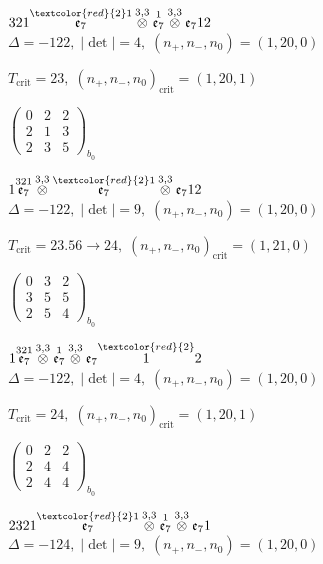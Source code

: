 \documentclass[10pt]{article}
\begin{document}
$321\overset{\textcolor{red}{2}1}{\mathfrak{e}_7}\overset{3,3}{\otimes}\overset{1}{\mathfrak{e}_7}\overset{3,3}{\otimes}\mathfrak{e}_712$ \quad $\Delta=-122,\; |\det|=4,\; (n_+,n_-,n_0)=(1,20,0)$

\hspace{1em}$T_{\text{crit}}=23,\; (n_+,n_-,n_0)_{\text{crit}}=(1,20,1)$

\hspace{2em}$\left(\begin{smallmatrix}0 & 2 & 2 \\ 2 & 1 & 3 \\ 2 & 3 & 5\end{smallmatrix}\right)_{\!b_0}$

$1\overset{321}{\mathfrak{e}_7}\overset{3,3}{\otimes}\overset{\textcolor{red}{2}1}{\mathfrak{e}_7}\overset{3,3}{\otimes}\mathfrak{e}_712$ \quad $\Delta=-122,\; |\det|=9,\; (n_+,n_-,n_0)=(1,20,0)$

\hspace{1em}$T_{\text{crit}}=23.56 \to 24,\; (n_+,n_-,n_0)_{\text{crit}}=(1,21,0)$

\hspace{2em}$\left(\begin{smallmatrix}0 & 3 & 2 \\ 3 & 5 & 5 \\ 2 & 5 & 4\end{smallmatrix}\right)_{\!b_0}$

$1\overset{321}{\mathfrak{e}_7}\overset{3,3}{\otimes}\overset{1}{\mathfrak{e}_7}\overset{3,3}{\otimes}\mathfrak{e}_7\overset{\textcolor{red}{2}}{1}2$ \quad $\Delta=-122,\; |\det|=4,\; (n_+,n_-,n_0)=(1,20,0)$

\hspace{1em}$T_{\text{crit}}=24,\; (n_+,n_-,n_0)_{\text{crit}}=(1,20,1)$

\hspace{2em}$\left(\begin{smallmatrix}0 & 2 & 2 \\ 2 & 4 & 4 \\ 2 & 4 & 4\end{smallmatrix}\right)_{\!b_0}$

\smallskip

$2321\overset{\textcolor{red}{2}1}{\mathfrak{e}_7}\overset{3,3}{\otimes}\overset{1}{\mathfrak{e}_7}\overset{3,3}{\otimes}\mathfrak{e}_71$ \quad $\Delta=-124,\; |\det|=9,\; (n_+,n_-,n_0)=(1,20,0)$
\end{document}
